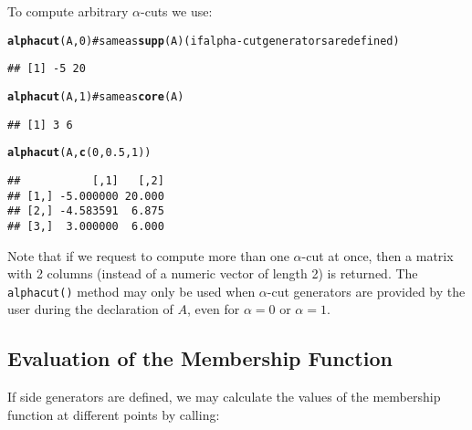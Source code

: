 \documentclass[11pt]{article}\usepackage{graphicx, color}
\makeatletter
\newcommand{\hlfunctioncall}[1]{\textcolor[rgb]{0.501960784313725,0,0.329411764705882}{\textbf{#1}}}%
\newcommand{\hlcomment}[1]{\textcolor[rgb]{0.180392156862745,0.6,0.341176470588235}{#1}}%
\newenvironment{kframe}{%
 \def\at@end@of@kframe{}%
 \ifinner\ifhmode%
  \def\at@end@of@kframe{\end{minipage}}%
  \begin{minipage}{\columnwidth}%
 \fi\fi%
 \def\FrameCommand##1{\hskip\@totalleftmargin \hskip-\fboxsep
 \colorbox{shadecolor}{##1}\hskip-\fboxsep
     \hskip-\linewidth \hskip-\@totalleftmargin \hskip\columnwidth}%
 \MakeFramed {\advance\hsize-\width
   \@totalleftmargin\z@ \linewidth\hsize
   \@setminipage}}%
 {\par\unskip\endMakeFramed%
 \at@end@of@kframe}
\newenvironment{knitrout}{}{} %
\makeatother
\begin{document}
\noindent
To compute arbitrary $\alpha$-cuts we use:

\begin{knitrout}\small
{}\color{fgcolor}\begin{kframe}
\begin{alltt}
\hlfunctioncall{alphacut}(A, 0) \hlcomment{# same as \hlfunctioncall{supp}(A) (if alpha-cut generators are defined)}
\end{alltt}
\begin{verbatim}
## [1] -5 20
\end{verbatim}
\begin{alltt}
\hlfunctioncall{alphacut}(A, 1) \hlcomment{# same as \hlfunctioncall{core}(A)}
\end{alltt}
\begin{verbatim}
## [1] 3 6
\end{verbatim}
\begin{alltt}
\hlfunctioncall{alphacut}(A, \hlfunctioncall{c}(0,0.5,1))
\end{alltt}
\begin{verbatim}
##           [,1]   [,2]
## [1,] -5.000000 20.000
## [2,] -4.583591  6.875
## [3,]  3.000000  6.000
\end{verbatim}
\end{kframe}
\end{knitrout}


\noindent
Note that if we request to compute more than one $\alpha$-cut at once, then
a matrix with 2 columns (instead of a numeric vector of length 2) is returned.
The \texttt{alphacut()} method may only be used when $\alpha$-cut generators are
provided by the user during the declaration of $A$, even for $\alpha=0$
or $\alpha=1$.

\subsection{Evaluation of the Membership Function}

If side generators are defined, we may calculate
the values of the membership function at different points by calling:
\end{document}
